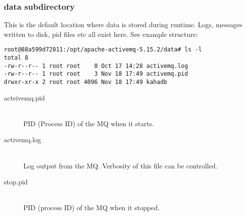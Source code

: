     \subsubsection{data subdirectory}
    This is the default location where data is stored during runtime. Logs, messages written to disk, pid files etc all exist here. See example structure:
    \begin{lstlisting}[caption={Sample data sub-directory layout}]
    root@88a599d72811:/opt/apache-activemq-5.15.2/data# ls -l 
total 8
-rw-r--r-- 1 root root    0 Oct 17 14:28 activemq.log
-rw-r--r-- 1 root root    3 Nov 18 17:49 activemq.pid
drwxr-xr-x 2 root root 4096 Nov 18 17:49 kahadb
    \end{lstlisting}
    \begin{description}
      \item[acteivemq.pid] \hfill \\
        PID (Process ID) of the MQ when it starts.
      \item[activemq.log] \hfill \\
        Log output from the MQ. Verbosity of this file can be controlled.
      \item[stop.pid] \hfill \\
        PID (process ID) of the MQ when it stopped.
    \end{description}
